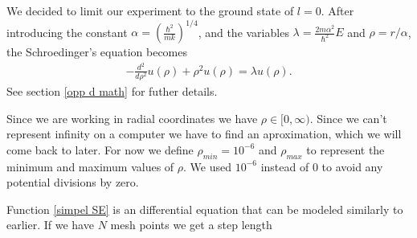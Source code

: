 \documentclass[a4paper]{article}
\begin{document}
We decided to limit our experiment to the ground state of $l=0$. After introducing the constant $\alpha = \left(\frac{\hbar^2}{mk}\right)^{1/4}$, and the variables $\lambda = \frac{2m\alpha^2}{\hbar^2}E$ and $\rho = r/\alpha$, the Schroedinger’s equation becomes
\begin{align}
-\frac{d^2}{d\rho^2} u(\rho) + \rho^2 u(\rho) = \lambda u(\rho). \label{simpel SE}
\end{align}
See section \ref{opp d math} for futher details. 

Since we are working in radial coordinates we have $\rho \in [0,\infty)$. Since we can't represent infinity on a computer we have to find an aproximation, which we will come back to later. For now we define $\rho_{min}=10^{-6}$ and $\rho_{max}$ to represent the  minimum and maximum values of $\rho$. We used $10^{-6}$ instead of $0$ to avoid any potential divisions by zero.

Function \ref{simpel SE} is an differential equation that can be modeled similarly to earlier. If we have $N$ mesh points we get a step length
\end{document}
